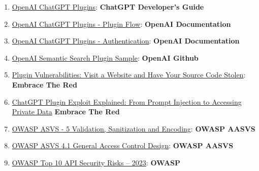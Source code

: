 \documentclass[
]{article}
\providecommand{\tightlist}{%
  \setlength{\itemsep}{0pt}\setlength{\parskip}{0pt}}
\begin{document}
\begin{enumerate}
\def\labelenumi{\arabic{enumi}.}
\tightlist
\item
  \href{https://platform.openai.com/docs/plugins/introduction}{OpenAI
  ChatGPT Plugins}: \textbf{ChatGPT Developer's Guide}
\item
  \href{https://platform.openai.com/docs/plugins/introduction/plugin-flow}{OpenAI
  ChatGPT Plugins - Plugin Flow}: \textbf{OpenAI Documentation}
\item
  \href{https://platform.openai.com/docs/plugins/authentication/service-level}{OpenAI
  ChatGPT Plugins - Authentication}: \textbf{OpenAI Documentation}
\item
  \href{https://github.com/openai/chatgpt-retrieval-plugin}{OpenAI
  Semantic Search Plugin Sample}: \textbf{OpenAI Github}
\item
  \href{https://embracethered.com/blog/posts/2023/chatgpt-plugin-vulns-chat-with-code/}{Plugin
  Vulnerabilities: Visit a Website and Have Your Source Code Stolen}:
  \textbf{Embrace The Red}
\item
  \href{https://embracethered.com/blog/posts/2023/chatgpt-cross-plugin-request-forgery-and-prompt-injection./}{ChatGPT
  Plugin Exploit Explained: From Prompt Injection to Accessing Private
  Data} \textbf{Embrace The Red}
\item
  \href{https://owasp-aasvs4.readthedocs.io/en/latest/V5.html\#validation-sanitization-and-encoding}{OWASP
  ASVS - 5 Validation, Sanitization and Encoding}: \textbf{OWASP AASVS}
\item
  \href{https://owasp-aasvs4.readthedocs.io/en/latest/V4.1.html\#general-access-control-design}{OWASP
  ASVS 4.1 General Access Control Design}: \textbf{OWASP AASVS}
\item
  \href{https://owasp.org/API-Security/editions/2023/en/0x11-t10/}{OWASP
  Top 10 API Security Risks -- 2023}: \textbf{OWASP}
\end{enumerate}
\end{document}
